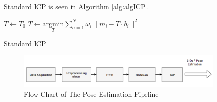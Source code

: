 Standard ICP is seen in Algorithm \ref{alg:algICP}.

\begin{algorithm}[H]
\SetAlgoLined
{}
 $T \leftarrow T_{0}$  \;
 {
   $T \leftarrow \underset{T}{\mathrm{argmin}} {\sum \limits_{n=1}^{N}\omega _{i}\|m_{i}-T \cdot b_{i}\|^{2}}$\;
}
\caption{Standard ICP}
\label{alg:algICP}
\end{algorithm}

\begin{figure}[!h]
\begin{center}
\includegraphics[width=4in]{diagrams/lastone.png}
\caption{Flow Chart of The Pose Estimation Pipeline}
\label{fig:icp}
\end{center}
\end{figure}




































